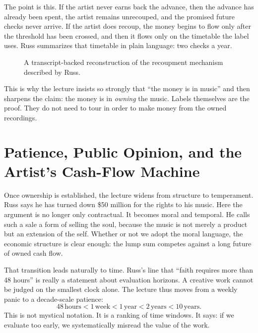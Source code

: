The point is this. If the artist never earns back the advance, then the advance has already been spent, the artist remains unrecouped, and the promised future checks never arrive. If the artist does recoup, the money begins to flow only after the threshold has been crossed, and then it flows only on the timetable the label uses. Russ summarizes that timetable in plain language: two checks a year.

\begin{figure}
\centering
{}
\caption{A transcript-backed reconstruction of the recoupment mechanism described by Russ.}
\end{figure}

This is why the lecture insists so strongly that ``the money is in music'' and then sharpens the claim: the money is in \emph{owning} the music. Labels themselves are the proof. They do not need to tour in order to make money from the owned recordings.

\section{Patience, Public Opinion, and the Artist's Cash-Flow Machine}

Once ownership is established, the lecture widens from structure to temperament. Russ says he has turned down \$50 million for the rights to his music. Here the argument is no longer only contractual. It becomes moral and temporal. He calls such a sale a form of selling the soul, because the music is not merely a product but an extension of the self. Whether or not we adopt the moral language, the economic structure is clear enough: the lump sum competes against a long future of owned cash flow.

That transition leads naturally to time. Russ's line that ``faith requires more than 48 hours'' is really a statement about evaluation horizons. A creative work cannot be judged on the smallest clock alone. The lecture thus moves from a weekly panic to a decade-scale patience:
\begin{equation}
48\,\mathrm{hours}<1\,\mathrm{week}<1\,\mathrm{year}<2\,\mathrm{years}<10\,\mathrm{years}.
\end{equation}
This is not mystical notation. It is a ranking of time windows. It says: if we evaluate too early, we systematically misread the value of the work.

